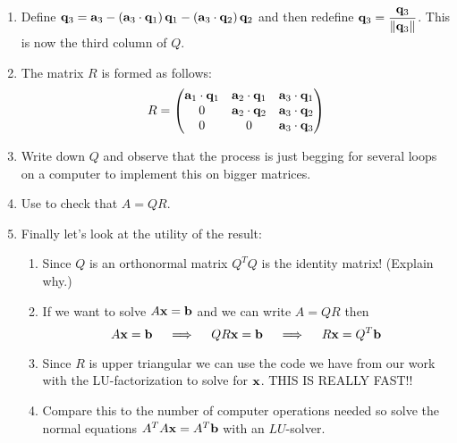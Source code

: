 \begin{problem}
\begin{enumerate}
        \item Define ${\bf q}_3 = \displaystyle {\bf a}_3 - \left( {\bf a}_3 \cdot {\bf q}_1 \right){\bf q}_1
            - \left( {\bf a}_3 \cdot {\bf q}_2 \right){\bf q}_2$ and then redefine $\displaystyle
            {\bf q}_3 = \frac{{\bf q}_3}{\|{\bf q}_3\|}$.  This is now the third column of
            $Q$.\\
        \item The matrix $R$ is formed as follows:
            \[ R = \begin{pmatrix} {\bf a}_1 \cdot {\bf q}_1 & {\bf a}_2 \cdot {\bf q}_1 & {\bf a}_3 \cdot
                    {\bf q}_1 \\ 0 & {\bf a}_2 \cdot {\bf q}_2 & {\bf a}_3 \cdot {\bf q}_2 \\ 0 & 0 & {\bf a}_3
                    \cdot {\bf q}_3 \end{pmatrix} \]
        \item Write down $Q$ and observe that the process is just begging for several
            loops on a computer to implement this on bigger matrices.
        \item Use \ProgLang to check that $A = QR$.
        \item Finally let's look at the utility of the result:
            \begin{enumerate}
                \item Since $Q$ is an orthonormal matrix $Q^TQ$ is the identity matrix!
                    (Explain why.)
                \item If we want to solve $A{\bf x} = {\bf b}$ and we can write $A = QR$ then 
                    \[ A {\bf x} = {\bf b} \quad \implies \quad QR {\bf x} = {\bf b} \quad \implies \quad
                        R {\bf x} = Q^T {\bf b} \]
                \item Since $R$ is upper triangular we can use the  code we
                    have from our work with the LU-factorization to solve for ${\bf x}$.  THIS
                    IS REALLY FAST!!
                \item Compare this to the number of computer operations needed so solve
                    the normal equations $A^TA{\bf x} = A^T {\bf b}$ with an $LU$-solver.
            \end{enumerate}
    \end{enumerate}
\end{problem}


